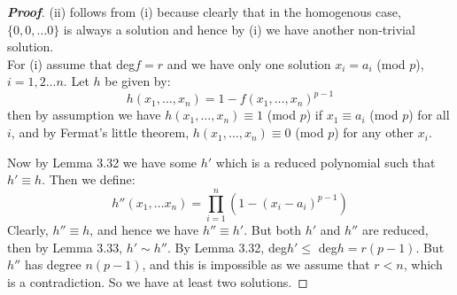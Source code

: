 \begin{proof}[\bf Proof] (ii) follows from (i) because clearly that in the homogenous case, $\{0,0, \ldots 0\}$ is always a solution and hence by (i) we have another non-trivial solution.\\
For (i) assume that deg$f = r$ and we have only one solution $x_i=a_i$ (mod $p$), $i=1,2 \ldots n$. Let $h$ be given by:
\begin{equation*} h(x_1, \ldots, x_n)=1-f(x_1,\ldots ,x_n)^{p-1} \end{equation*}
then by assumption we have $h(x_1, \ldots ,x_n) \equiv 1$ (mod $p$) if $x_1 \equiv a_i$ (mod $p$) for all $i$, and by Fermat's little theorem, $h(x_1, \ldots ,x_n) \equiv 0$ (mod $p$) for any other $x_i$.

Now by Lemma 3.32 we have some $h'$ which is a reduced polynomial such that $h' \equiv h$. Then we define:
\begin{equation*} h''(x_1, \ldots x_n)=\prod_{i=1}^{n}\left(1-(x_i-a_i)^{p-1}\right) \end{equation*}
Clearly, $h'' \equiv h$, and hence we have $h'' \equiv h'$. But both $h'$ and $h''$ are reduced, then by Lemma 3.33, $h' \sim h''$. By Lemma 3.32, deg$h' \le$ deg$h = r(p-1)$. But $h''$ has degree $n(p-1)$, and this is impossible as we assume that $r<n$, which is a contradiction. So we have at least two solutions.
\end{proof}

